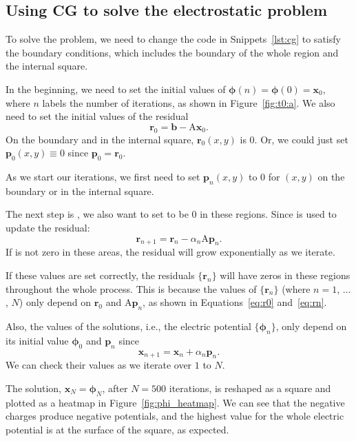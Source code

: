 \subsection{Using CG to solve the electrostatic problem}

To solve the problem, we need to change the
code in Snippets~\ref{lst:cg} to satisfy the boundary conditions, which includes
the boundary of the whole region and the internal square.

In the beginning, we need to set the initial values of
\(\bm{\phi}(n) = \bm{\phi}(0) = \bm{x}_0\),
where \(n\) labels the number of iterations, as shown in Figure~\ref{fig:t0:a}.
We also need to set the initial values of the residual
%
\begin{equation}\label{eq:r0}
    \bm{r}_0 = \bm{b} - \mathrm{A} \bm{x}_0.
\end{equation}
%
On the boundary and in the internal square, \(\bm{r}_0(x, y)\) is \(0\).
Or, we could just set \(\bm{p}_0(x, y) \equiv 0\) since \(\bm{p}_0 = \bm{r}_0\).

As we start our iterations, we first need to set \(\bm{p}_n(x, y)\) to \(0\)
for \((x, y)\) on the boundary or in the internal square.

The next step is , we also want to set  to be \(0\)
in these regions. Since  is used to update the residual:
%
\begin{equation}\label{eq:rn}
    \bm{r}_{n+1} = \bm{r}_n - \alpha_n \mathrm{A} \bm{p}_n.
\end{equation}
%
If  is not zero in these areas, the residual will grow exponentially
as we iterate.

If these values are set correctly, the residuals \(\{\bm{r}_n\}\) will have
zeros in these regions throughout the whole process.
This is because the values of \(\{\bm{r}_n\}\) (where \(n = 1\), \(\ldots\), \(N\))
only depend on \(\bm{r}_0\) and \(\mathrm{A} \bm{p}_n\), as shown in
Equations~\eqref{eq:r0} and~\eqref{eq:rn}.

Also, the values of the solutions, i.e., the electric potential \(\{\bm{\phi}_n\}\),
only depend on its initial value \(\bm{\phi}_0\) and \(\bm{p}_n\) since
%
\begin{equation}
    \bm{x}_{n+1} = \bm{x}_n + \alpha_n \bm{p}_n.
\end{equation}
%
We can check their values as we iterate over \(1\) to \(N\).

The solution, \(\bm{x}_N = \bm{\phi}_N\), after \(N=500\) iterations, is reshaped
as a square and plotted as a heatmap in Figure~\ref{fig:phi_heatmap}.
We can see that the negative charges produce negative potentials,
and the highest value for the whole electric potential is at the surface
of the square, as expected.

